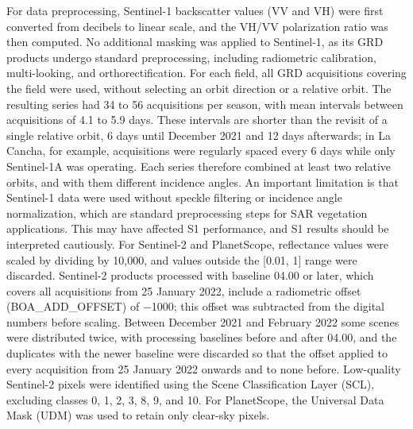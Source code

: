 \documentclass[
  british,
]{interact}
\begin{document}
For data preprocessing, Sentinel-1 backscatter values (VV and VH) were
first converted from decibels to linear scale, and the VH/VV
polarization ratio was then computed. No additional masking was applied
to Sentinel-1, as its GRD products undergo standard preprocessing,
including radiometric calibration, multi-looking, and
orthorectification. For each field, all GRD acquisitions covering the
field were used, without selecting an orbit direction or a relative
orbit. The resulting series had 34 to 56 acquisitions per season, with
mean intervals between acquisitions of 4.1 to 5.9 days. These intervals
are shorter than the revisit of a single relative orbit, 6 days until
December 2021 and 12 days afterwards; in La Cancha, for example,
acquisitions were regularly spaced every 6 days while only Sentinel-1A
was operating. Each series therefore combined at least two relative
orbits, and with them different incidence angles. An important
limitation is that Sentinel-1 data were used without speckle filtering
or incidence angle normalization, which are standard preprocessing steps
for SAR vegetation applications. This may have affected S1 performance,
and S1 results should be interpreted cautiously. For Sentinel-2 and
PlanetScope, reflectance values were scaled by dividing by 10,000, and
values outside the {[}0.01, 1{]} range were discarded. Sentinel-2
products processed with baseline 04.00 or later, which covers all
acquisitions from 25 January 2022, include a radiometric offset
(BOA\_ADD\_OFFSET) of −1000; this offset was subtracted from the digital
numbers before scaling. Between December 2021 and February 2022 some
scenes were distributed twice, with processing baselines before and
after 04.00, and the duplicates with the newer baseline were discarded
so that the offset applied to every acquisition from 25 January 2022
onwards and to none before. Low-quality Sentinel-2 pixels were
identified using the Scene Classification Layer (SCL), excluding classes
0, 1, 2, 3, 8, 9, and 10. For PlanetScope, the Universal Data Mask (UDM)
was used to retain only clear-sky pixels.
\end{document}
